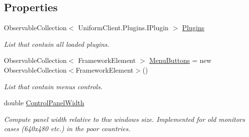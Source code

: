 \subsection*{Properties}
\begin{DoxyCompactItemize}
\item 
Observable\+Collection$<$ Uniform\+Client.\+Plugins.\+I\+Plugin $>$ \mbox{\hyperlink{class_teacher_handbook_1_1_u_i_1_1_windows_1_1_main_window_ab39623b0a06a164945f5748514c5d5c9}{Plugins}}
\begin{DoxyCompactList}\small\item\em List that contain all loaded plugins. \end{DoxyCompactList}\item 
Observable\+Collection$<$ Framework\+Element $>$ \mbox{\hyperlink{class_teacher_handbook_1_1_u_i_1_1_windows_1_1_main_window_a9fbd1efdebcd7758b71b6ab1a03a745b}{Menu\+Buttons}} = new Observable\+Collection$<$Framework\+Element$>$()
\begin{DoxyCompactList}\small\item\em List that contain menu\textquotesingle{}s controls. \end{DoxyCompactList}\item 
double \mbox{\hyperlink{class_teacher_handbook_1_1_u_i_1_1_windows_1_1_main_window_a9535228898acc92c7fa2f20a86477eb3}{Control\+Panel\+Width}}
\begin{DoxyCompactList}\small\item\em Compute panel width relative to thw window\textquotesingle{}s size. Implemented for old monitors\textquotesingle{} cases (640x480 etc.) in the poor countries. \end{DoxyCompactList}\end{DoxyCompactItemize}
